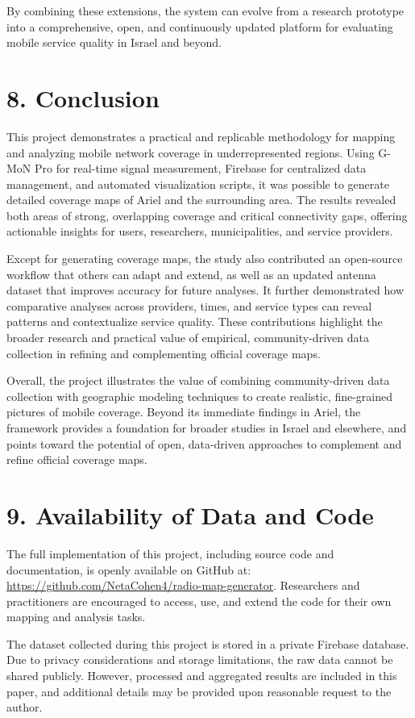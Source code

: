 \documentclass[11pt]{article}
\begin{document}
By combining these extensions, the system can evolve from a research
prototype into a comprehensive, open, and continuously updated platform
for evaluating mobile service quality in Israel and beyond.

\hypertarget{conclusion}{%
\section{8. Conclusion}\label{conclusion}}

This project demonstrates a practical and replicable methodology for
mapping and analyzing mobile network coverage in underrepresented
regions. Using G-MoN Pro for real-time signal measurement, Firebase for
centralized data management, and automated visualization scripts, it was
possible to generate detailed coverage maps of Ariel and the surrounding
area. The results revealed both areas of strong, overlapping coverage
and critical connectivity gaps, offering actionable insights for users,
researchers, municipalities, and service providers.

Except for generating coverage maps, the study also contributed an
open-source workflow that others can adapt and extend, as well as an
updated antenna dataset that improves accuracy for future analyses. It
further demonstrated how comparative analyses across providers, times,
and service types can reveal patterns and contextualize service quality.
These contributions highlight the broader research and practical value
of empirical, community-driven data collection in refining and
complementing official coverage maps.

Overall, the project illustrates the value of combining community-driven
data collection with geographic modeling techniques to create realistic,
fine-grained pictures of mobile coverage. Beyond its immediate findings
in Ariel, the framework provides a foundation for broader studies in
Israel and elsewhere, and points toward the potential of open,
data-driven approaches to complement and refine official coverage maps.

\hypertarget{availability-of-data-and-code}{%
\section{9. Availability of Data and
Code}\label{availability-of-data-and-code}}

The full implementation of this project, including source code and
documentation, is openly available on GitHub at:\\
\href{https://github.com/NetaCohen4/radio-map-generator}{\ul{https://github.com/NetaCohen4/radio-map-generator}}.
Researchers and practitioners are encouraged to access, use, and extend
the code for their own mapping and analysis tasks.\Cite{cohen2025}

The dataset collected during this project is stored in a private
Firebase database. Due to privacy considerations and storage
limitations, the raw data cannot be shared publicly. However, processed
and aggregated results are included in this paper, and additional
details may be provided upon reasonable request to the author.

\printbibliography
\end{document}
